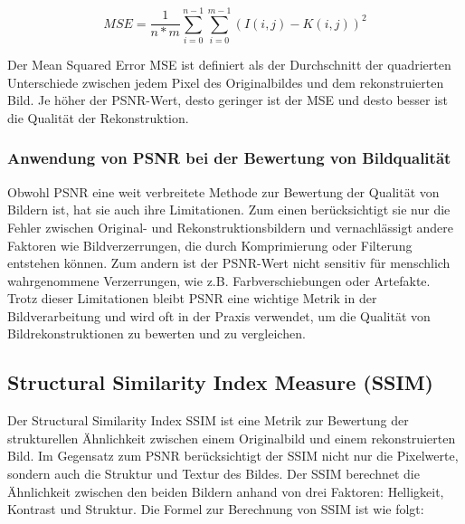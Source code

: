 
            \begin{equation}
                MSE = \frac{1}{n*m} \sum_{i=0}^{n-1} \sum_{i=0}^{m-1} (I(i,j) - K(i,j))^2
            \end{equation}

            Der Mean Squared Error \ac{MSE} ist definiert als der Durchschnitt der quadrierten Unterschiede zwischen jedem Pixel des Originalbildes und dem rekonstruierten Bild.
            Je höher der PSNR-Wert, desto geringer ist der \ac{MSE} und desto besser ist die Qualität der Rekonstruktion.

        \subsubsection{Anwendung von \ac{PSNR} bei der Bewertung von Bildqualität}
            Obwohl \ac{PSNR} eine weit verbreitete Methode zur Bewertung der Qualität von Bildern ist, hat sie auch ihre Limitationen.
            Zum einen berücksichtigt sie nur die Fehler zwischen Original- und Rekonstruktionsbildern und vernachlässigt andere Faktoren wie Bildverzerrungen, die durch Komprimierung oder Filterung entstehen können.
            Zum andern ist der \ac{PSNR}-Wert nicht sensitiv für menschlich wahrgenommene Verzerrungen, wie z.B. Farbverschiebungen oder Artefakte.
            Trotz dieser Limitationen bleibt \ac{PSNR} eine wichtige Metrik in der Bildverarbeitung und wird oft in der Praxis verwendet, um die Qualität von Bildrekonstruktionen zu bewerten und zu vergleichen.
    \subsection{Structural Similarity Index Measure (SSIM)}

        Der Structural Similarity Index \ac{SSIM} ist eine Metrik zur Bewertung der strukturellen Ähnlichkeit zwischen einem Originalbild und einem rekonstruierten Bild.
        Im Gegensatz zum PSNR berücksichtigt der \ac{SSIM} nicht nur die Pixelwerte, sondern auch die Struktur und Textur des Bildes.
        Der \ac{SSIM} berechnet die Ähnlichkeit zwischen den beiden Bildern anhand von drei Faktoren: Helligkeit, Kontrast und Struktur. Die Formel zur Berechnung von \ac{SSIM} ist wie folgt:

